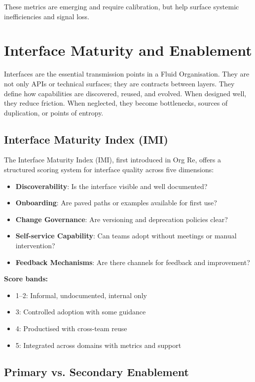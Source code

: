 \documentclass[12pt]{article}
\begin{document}
These metrics are emerging and require calibration, but help surface systemic inefficiencies and signal loss.

\section{Interface Maturity and Enablement}

Interfaces are the essential transmission points in a Fluid Organisation. They are not only APIs or technical surfaces; they are contracts between layers. They define how capabilities are discovered, reused, and evolved. When designed well, they reduce friction. When neglected, they become bottlenecks, sources of duplication, or points of entropy.

\subsection*{Interface Maturity Index (IMI)}

The Interface Maturity Index (IMI), first introduced in Org Re, offers a structured scoring system for interface quality across five dimensions:
\begin{itemize}
    \item \textbf{Discoverability}: Is the interface visible and well documented?
    \item \textbf{Onboarding}: Are paved paths or examples available for first use?
    \item \textbf{Change Governance}: Are versioning and deprecation policies clear?
    \item \textbf{Self-service Capability}: Can teams adopt without meetings or manual intervention?
    \item \textbf{Feedback Mechanisms}: Are there channels for feedback and improvement?
\end{itemize}

\textbf{Score bands:}
\begin{itemize}
    \item 1--2: Informal, undocumented, internal only
    \item 3: Controlled adoption with some guidance
    \item 4: Productised with cross-team reuse
    \item 5: Integrated across domains with metrics and support
\end{itemize}

\subsection*{Primary vs. Secondary Enablement}
\end{document}
